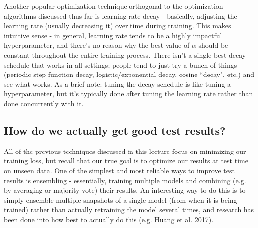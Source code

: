Another popular optimization technique orthogonal to the optimization algorithms discussed thus far is learning rate decay - basically, adjusting the learning rate (usually decreasing it) over time during training. This makes intuitive sense - in general, learning rate tends to be a highly impactful hyperparameter, and there's no reason why the best value of $\alpha$ should be constant throughout the entire training process. There isn't a single best decay schedule that works in all settings; people tend to just try a bunch of things (periodic step function decay, logistic/exponential decay, cosine ``decay", etc.) and see what works. As a brief note: tuning the decay schedule is like tuning a hyperparameter, but it's typically done after tuning the learning rate rather than done concurrently with it.

\subsection{How do we actually get good test results?}
All of the previous techniques discussed in this lecture focus on minimizing our training loss, but recall that our true goal is to optimize our results at test time on unseen data. One of the simplest and most reliable ways to improve test results is ensembling - essentially, training multiple models and combining (e.g. by averaging or majority vote) their results. An interesting way to do this is to simply ensemble multiple snapshots of a single model (from when it is being trained) rather than actually retraining the model several times, and research has been done into how best to actually do this (e.g. Huang et al. 2017).

